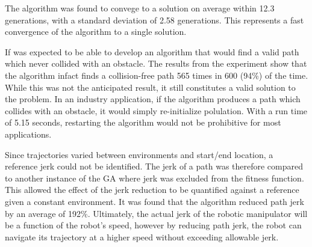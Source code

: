 The algorithm was found to convege to a solution on average within 12.3 generations, with a standard deviation of 2.58 generations. This represents a fast convergence of the algorithm to a single solution.

If was expected to be able to develop an algorithm that would find a valid path which never collided with an obstacle. The results from the experiment show that the algorithm infact finds a collision-free path 565 times in 600 (94\%) of the time. While this was not the anticipated result, it still constitutes a valid solution to the problem. In an industry application, if the algorithm produces a path which collides with an obstacle, it would simply re-initialize polulation. With a run time of 5.15 seconds, restarting the algorithm would not be prohibitive for most applications.

Since trajectories varied between environments and start/end location, a reference jerk could not be identified. The jerk of a path was therefore compared to another instance of the GA where jerk was excluded from the fitness function. This allowed the effect of the jerk reduction to be quantified against a reference given a constant environment. It was found that the algorithm reduced path jerk by an average of 192\%. Ultimately, the actual jerk of the robotic manipulator will be a function of the robot's speed, however by reducing path jerk, the robot can navigate its trajectory at a higher speed without exceeding allowable jerk.



